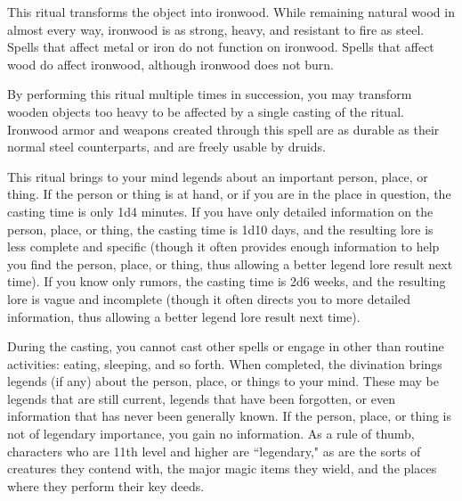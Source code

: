 \begin{spelleffect}
This ritual transforms the object into ironwood. While remaining natural wood in almost every way, ironwood is as strong, heavy, and resistant to fire as steel. Spells that affect metal or iron do not function on ironwood. Spells that affect wood do affect ironwood, although ironwood does not burn.
\end{spelleffect}
\begin{spellnotes}
By performing this ritual multiple times in succession, you may transform wooden objects too heavy to be affected by a single casting of the ritual. Ironwood armor and weapons created through this spell are as durable as their normal steel counterparts, and are freely usable by druids.
\end{spellnotes}

\begin{spelleffect}
This ritual brings to your mind legends about an important person, place, or thing. If the person or thing is at hand, or if you are in the place in question, the casting time is only 1d4 minutes. If you have only detailed information on the person, place, or thing, the casting time is 1d10 days, and the resulting lore is less complete and specific (though it often provides enough information to help you find the person, place, or thing, thus allowing a better legend lore result next time). If you know only rumors, the casting time is 2d6 weeks, and the resulting lore is vague and incomplete (though it often directs you to more detailed information, thus allowing a better legend lore result next time).
\par During the casting, you cannot cast other spells or engage in other than routine activities: eating, sleeping, and so forth. When completed, the divination brings legends (if any) about the person, place, or things to your mind. These may be legends that are still current, legends that have been forgotten, or even information that has never been generally known. If the person, place, or thing is not of legendary importance, you gain no information. As a rule of thumb, characters who are 11th level and higher are ``legendary," as are the sorts of creatures they contend with, the major magic items they wield, and the places where they perform their key deeds.
\end{spelleffect}

